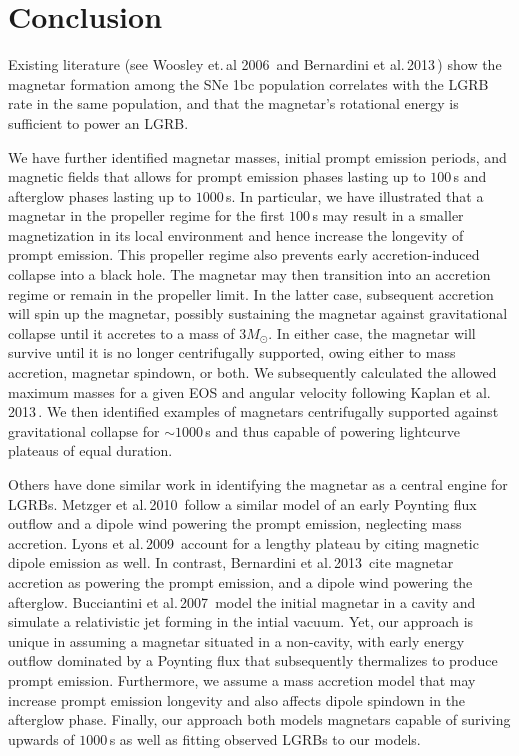 \documentclass{article}
\begin{document}
\section{Conclusion} \label{sec:conc}

Existing literature (see Woosley et.\,al 2006\,\cite{Woosley:2006fn} and Bernardini et al.\,2013\,\cite{Bernardini:2013nfa}) show the magnetar formation among the SNe 1bc population correlates with the LGRB rate in the same population, and that the magnetar's rotational energy is sufficient to power an LGRB.

We have further identified magnetar masses, initial prompt emission periods, and magnetic fields that allows for prompt emission phases lasting up to $100$\,s and afterglow phases lasting up to $1000$\,s. In particular, we have illustrated that a magnetar in the propeller regime for the first $100$\,s may result in a smaller magnetization in its local environment and hence increase the longevity of prompt emission. This propeller regime also prevents early accretion-induced collapse into a black hole. The magnetar may then transition into an accretion regime or remain in the propeller limit. In the latter case, subsequent accretion will spin up the magnetar, possibly sustaining the magnetar against gravitational collapse until it accretes to a mass of $3M_{\odot}$. In either case, the magnetar will survive until it is no longer centrifugally supported, owing either to mass accretion, magnetar spindown, or both. We subsequently calculated the allowed maximum masses for a given EOS and angular velocity following Kaplan et al.\,2013\,\cite{Kaplan:2013wra}. We then identified examples of magnetars centrifugally supported against gravitational collapse for $\sim 1000$\,s and thus capable of powering lightcurve plateaus of equal duration.

Others have done similar work in identifying the magnetar as a central engine for LGRBs. Metzger et al.\,2010\,\cite{Metzger:2010pp} follow a similar model of an early Poynting flux outflow and a dipole wind powering the prompt emission, neglecting mass accretion. Lyons et al.\,2009\,\cite{Lyons:2009ka} account for a lengthy plateau by citing magnetic dipole emission as well. In contrast, Bernardini et al.\,2013\,\cite{Bernardini:2013nfa} cite magnetar accretion as powering the prompt emission, and a dipole wind powering the afterglow. Bucciantini et al.\,2007\,\cite{Bucciantini:2007hy} model the initial magnetar in a cavity and simulate a relativistic jet forming in the intial vacuum. Yet, our approach is unique in assuming a magnetar situated in a non-cavity, with early energy outflow dominated by a Poynting flux that subsequently thermalizes to produce prompt emission. Furthermore, we assume a mass accretion model that may increase prompt emission longevity and also affects dipole spindown in the afterglow phase. Finally, our approach both models magnetars capable of suriving upwards of $1000$\,s as well as fitting observed LGRBs to our models.
\end{document}
